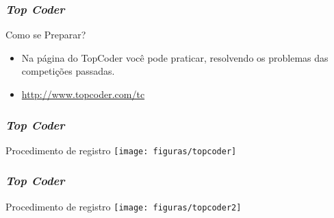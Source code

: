 \begin{frame}
 \frametitle{\em Top Coder}
 \begin{block}{Como se Preparar?}
  \begin{itemize}
   \item Na página do TopCoder você pode praticar, resolvendo os problemas das competições passadas.
   \item \url{http://www.topcoder.com/tc}
  \end{itemize}
 \end{block}
\end{frame}
\begin{frame}
 \frametitle{\em Top Coder}
 \begin{block}{Procedimento de registro}
  \centering
  \texttt{[image: figuras/topcoder]}
 \end{block}
\end{frame}
\begin{frame}
 \frametitle{\em Top Coder}
 \begin{block}{Procedimento de registro}
  \centering
  \texttt{[image: figuras/topcoder2]}
 \end{block}
\end{frame}
